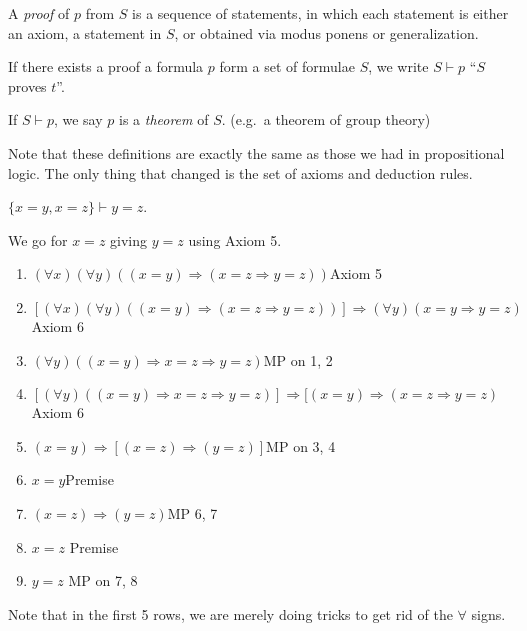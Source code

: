 \documentclass[a4paper]{article}
\begin{document}
\begin{defi}[Proof]
  A \emph{proof} of $p$ from $S$ is a sequence of statements, in which each statement is either an axiom, a statement in $S$, or obtained via modus ponens or generalization.
\end{defi}
\begin{defi}
  If there exists a proof a formula $p$ form a set of formulae $S$, we write $S\vdash p$ ``$S$ proves $t$''.
\end{defi}

\begin{defi}[Theorem]
  If $S\vdash p$, we say $p$ is a \emph{theorem} of $S$. (e.g.\ a theorem of group theory)
\end{defi}

Note that these definitions are exactly the same as those we had in propositional logic. The only thing that changed is the set of axioms and deduction rules.

\begin{eg}
  $\{x = y, x = z\}\vdash y = z$.

  We go for $x = z$ giving $y = z$ using Axiom 5.

  \begin{enumerate}[label=\arabic{*}.]
    \item $(\forall x)(\forall y)((x = y)\Rightarrow (x = z\Rightarrow y=z))$\hfill Axiom 5
    \item $[(\forall x)(\forall y)((x = y)\Rightarrow (x = z\Rightarrow y=z))]\Rightarrow (\forall y)(x = y\Rightarrow y = z)$ \hfill Axiom 6
    \item $(\forall y)((x = y) \Rightarrow x = z \Rightarrow y = z)$\hfill MP on 1, 2
    \item $[(\forall y)((x = y) \Rightarrow x = z \Rightarrow y = z)]\Rightarrow [(x = y)\Rightarrow (x = z\Rightarrow y = z)$\hfill Axiom 6
    \item $(x = y) \Rightarrow [(x = z) \Rightarrow (y = z)]$\hfill MP on 3, 4
    \item $x = y$\hfill Premise
    \item $(x = z) \Rightarrow (y = z)$\hfill MP 6, 7
    \item $x = z$ \hfill Premise
    \item $y = z$ \hfill MP on 7, 8
  \end{enumerate}

  Note that in the first 5 rows, we are merely doing tricks to get rid of the $\forall$ signs.
\end{eg}
\end{document}
